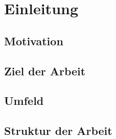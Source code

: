 \chapter{Einleitung}
\label{chap:einleitung}

\section{Motivation}

\section{Ziel der Arbeit}

\section{Umfeld}

\section{Struktur der Arbeit}
